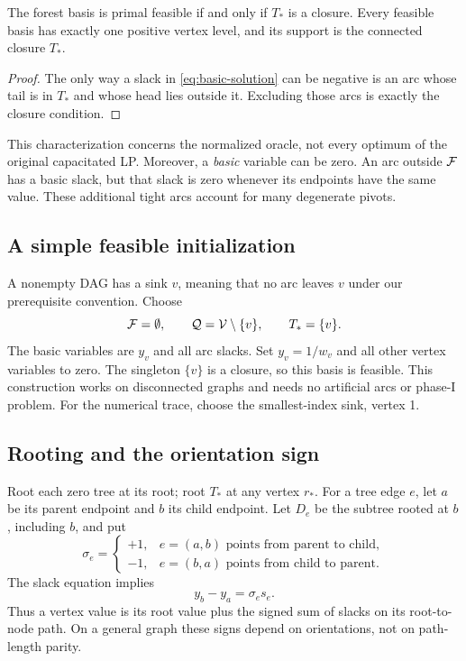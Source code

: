 \begin{corollary}\label{cor:feasible}
The forest basis is primal feasible if and only if $T_*$ is a closure.
Every feasible basis has exactly one positive vertex level, and its support
is the connected closure $T_*$.
\end{corollary}
\begin{proof}
The only way a slack in \eqref{eq:basic-solution} can be negative is an arc
whose tail is in $T_*$ and whose head lies outside it. Excluding those arcs
is exactly the closure condition.
\end{proof}

This characterization concerns the normalized oracle, not every optimum of
the original capacitated LP. Moreover, a \emph{basic} variable can be zero.
An arc outside $\mathcal F$ has a basic slack, but that slack is zero whenever its
endpoints have the same value. These additional tight arcs account for many
degenerate pivots.

\subsection{A simple feasible initialization}
A nonempty DAG has a sink $v$, meaning that no arc leaves $v$ under our
prerequisite convention. Choose
\begin{equation}\label{eq:initial}
 \mathcal F=\emptyset,\qquad \mathcal Q=\mathcal V\setminus\{v\},\qquad T_*=\{v\}.
\end{equation}
The basic variables are $y_v$ and all arc slacks. Set $y_v=1/w_v$ and all
other vertex variables to zero. The singleton $\{v\}$ is a closure, so this
basis is feasible. This construction works on disconnected graphs and needs
no artificial arcs or phase-I problem. For the numerical trace, choose the
smallest-index sink, vertex 1.

\subsection{Rooting and the orientation sign}
Root each zero tree at its root; root $T_*$ at any vertex $r_*$. For a tree
edge $e$, let $a$ be its parent endpoint and $b$ its child endpoint. Let
$D_e$ be the subtree rooted at $b$, including $b$, and put
\begin{equation}\label{eq:sign}
 \sigma_e=\begin{cases}
 +1,&e=(a,b)\text{ points from parent to child},\\
 -1,&e=(b,a)\text{ points from child to parent}.
 \end{cases}
\end{equation}
The slack equation implies
\begin{equation}\label{eq:parent-child}
 y_b-y_a=\sigma_e s_e.
\end{equation}
Thus a vertex value is its root value plus the signed sum of slacks on its
root-to-node path. On a general graph these signs depend on orientations,
not on path-length parity.

